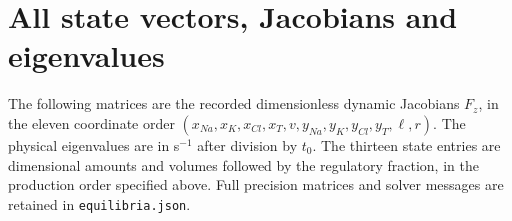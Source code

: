 

\section{All state vectors, Jacobians and eigenvalues}
The following matrices are the recorded dimensionless dynamic Jacobians $F_z$, in the eleven coordinate order $(x_{Na},x_K,x_{Cl},x_T,v,y_{Na},y_K,y_{Cl},y_T,\ell,r)$. The physical eigenvalues are in s$^{-1}$ after division by $t_0$. The thirteen state entries are dimensional amounts and volumes followed by the regulatory fraction, in the production order specified above. Full precision matrices and solver messages are retained in \texttt{equilibria.json}.
